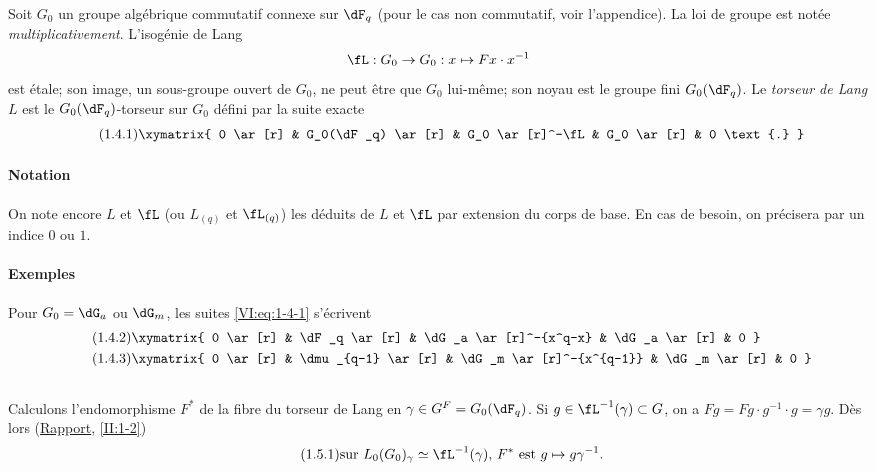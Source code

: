 Soit $G_0$ un groupe algébrique commutatif connexe sur $\dF_q$ (pour le cas 
non commutatif, voir l'appendice). La loi de groupe est notée 
\emph{multiplicativement}. L'isogénie de Lang 
\[
\fL:G_0 \to G_0: x\mapsto F x\cdot x^{-1}
\]
est étale; son image, un sous-groupe ouvert de $G_0$, ne peut être que 
$G_0$ lui-même; son noyau est le groupe fini $G_0(\dF_q)$. Le \emph{torseur 
de Lang} $L$ est le $G_0(\dF_q)$-torseur sur $G_0$ défini par la suite 
exacte 
\begin{equation*}\tag{1.4.1}\label{VI:eq:1-4-1}
\xymatrix{
  0 \ar[r] 
    & G_0(\dF_q) \ar[r] 
    & G_0 \ar[r]^-\fL 
    & G_0 \ar[r] 
    & 0 \text{.}
}
\end{equation*}


\paragraph{Notation}
On note encore $L$ et $\fL$ (ou $L_{(q)}$ et $\fL_{(q)}$) les  déduits 
de $L$ et $\fL$ par extension du corps de base. En cas de besoin, on 
précisera par un indice $0$ ou $1$.



\paragraph{Exemples}
Pour $G_0=\dG_a$ ou $\dG_m$, les suites \eqref{VI:eq:1-4-1} s'écrivent 
\begin{align*}\tag{1.4.2}\label{VI:eq:1-4-2}
&\xymatrix{
  0 \ar[r] 
    & \dF_q \ar[r] 
    & \dG_a \ar[r]^-{x^q-x} 
    & \dG_a \ar[r] 
    & 0 
} \\
\tag{1.4.3}\label{VI:eq:1-4-3}
&\xymatrix{
  0 \ar[r] 
    & \dmu_{q-1} \ar[r] 
    & \dG_m \ar[r]^-{x^{q-1}} 
    & \dG_m \ar[r] 
    & 0
}
\end{align*}





\subsection{}\label{VI:1-5}

Calculons l'endomorphisme $F^\ast$ de la fibre du torseur de Lang en 
$\gamma\in G^F=G_0(\dF_q)$. Si $g\in \fL^{-1}(\gamma)\subset G$, on a 
$F g = F g\cdot g^{-1}\cdot g = \gamma g$. Dès lors (\hyperref[II]{Rapport}, 
\ref{II:1-2}) 
\begin{equation*}\tag{1.5.1}\label{VI:eq:1-5-1}
  \text{sur $L_0(G_0)_\gamma\simeq \fL^{-1}(\gamma)$, $F^\ast$ est $g\mapsto g\gamma^{-1}$.}
\end{equation*}





